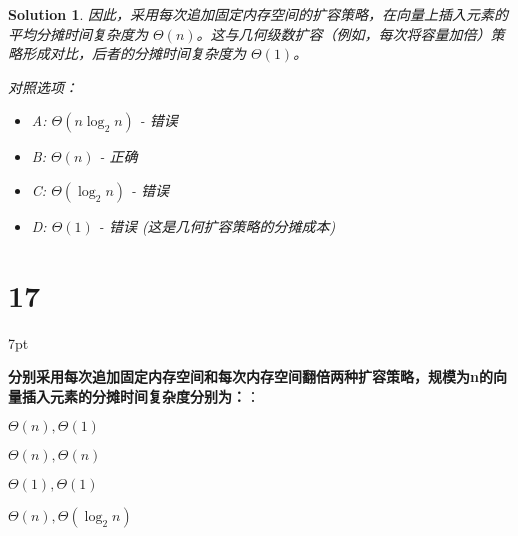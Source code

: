 \documentclass[UTF8]{report}
\newtheorem{solution}{Solution}
\theoremstyle{MyLineTheoremStyle} %
\theoremstyle{MyBlockTheoremStyle} %
\theoremstyle{MySubsubsectionStyle} %
\newenvironment{graybox}{%
        \def\FrameCommand{%
        \hspace{1pt}%
        {\color{gray}\small \vrule width 2pt}%
        {\color{graybox_color}\vrule width 4pt}%
        \colorbox{graybox_color}%
        }%
        \MakeFramed{\advance\hsize-\width\FrameRestore}%
        \noindent\hspace{-4.55pt}%
        \begin{adjustwidth}{}{7pt}%
        \vspace{2pt}\vspace{2pt}%
        }
        {%
        \vspace{2pt}\end{adjustwidth}\endMakeFramed%
        }
\begin{document}
\begin{solution}
因此，采用每次追加固定内存空间的扩容策略，在向量上插入元素的平均分摊时间复杂度为 $\Theta(n)$。这与几何级数扩容（例如，每次将容量加倍）策略形成对比，后者的分摊时间复杂度为 $\Theta(1)$。

对照选项：
\begin{itemize}
    \item A: $\Theta(n\log_{2}n)$ - 错误
    \item B: $\Theta(n)$ - 正确
    \item C: $\Theta(\log_{2}n)$ - 错误
    \item D: $\Theta(1)$ - 错误 (这是几何扩容策略的分摊成本)
\end{itemize}
\end{solution}

\section*{17}

\begin{graybox}
\textbf{分别采用每次追加固定内存空间和每次内存空间翻倍两种扩容策略，规模为n的向量插入元素的分摊时间复杂度分别为：}：
\begin{circledenum}
    \item $\Theta(n), \Theta(1)$
    \item $\Theta(n), \Theta(n)$
    \item $\Theta(1), \Theta(1)$
    \item $\Theta(n), \Theta(\log_{2}n)$
\end{circledenum}
\end{graybox}
\end{document}
